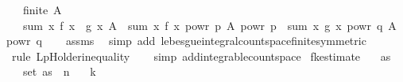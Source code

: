 \begin{isabellebody}
\ \ \ {\isachardoublequoteopen}finite\ A{\isachardoublequoteclose}\isanewline
\ \ \ {\isachardoublequoteopen}{\isasymbar}sum\ {\isacharparenleft}{\kern0pt}{\isasymlambda}x{\isachardot}{\kern0pt}\ f\ x\ {\isacharasterisk}{\kern0pt}\ g\ x{\isacharparenright}{\kern0pt}\ A{\isasymbar}\ {\isasymle}\ {\isacharparenleft}{\kern0pt}sum\ {\isacharparenleft}{\kern0pt}{\isasymlambda}x{\isachardot}{\kern0pt}\ {\isasymbar}f\ x{\isasymbar}\ powr\ p{\isacharparenright}{\kern0pt}\ A{\isacharparenright}{\kern0pt}\ powr\ {\isacharparenleft}{\kern0pt}{}{\isacharslash}{\kern0pt}p{\isacharparenright}{\kern0pt}\ {\isacharasterisk}{\kern0pt}\ {\isacharparenleft}{\kern0pt}sum\ {\isacharparenleft}{\kern0pt}{\isasymlambda}x{\isachardot}{\kern0pt}\ {\isasymbar}g\ x{\isasymbar}\ powr\ q{\isacharparenright}{\kern0pt}\ A{\isacharparenright}{\kern0pt}\ powr\ {\isacharparenleft}{\kern0pt}{}{\isacharslash}{\kern0pt}q{\isacharparenright}{\kern0pt}{\isachardoublequoteclose}\isanewline
%
\isadelimproof
\ \ %
\endisadelimproof
%
\isatagproof
{}\isamarkupfalse%
\ assms\ \isamarkupfalse%
\ {\isacharparenleft}{\kern0pt}simp\ add{\isacharcolon}{\kern0pt}\ lebesgue{\isacharunderscore}{\kern0pt}integral{\isacharunderscore}{\kern0pt}count{\isacharunderscore}{\kern0pt}space{\isacharunderscore}{\kern0pt}finite{\isacharbrackleft}{\kern0pt}symmetric{\isacharbrackright}{\kern0pt}{\isacharparenright}{\kern0pt}\isanewline
\ \ \isamarkupfalse%
\ {\isacharparenleft}{\kern0pt}rule\ Lp{\isachardot}{\kern0pt}Holder{\isacharunderscore}{\kern0pt}inequality{\isacharparenright}{\kern0pt}\isanewline
\ \ \isamarkupfalse%
\ {\isacharparenleft}{\kern0pt}simp\ add{\isacharcolon}{\kern0pt}integrable{\isacharunderscore}{\kern0pt}count{\isacharunderscore}{\kern0pt}space{\isacharparenright}{\kern0pt}{\isacharplus}{\kern0pt}%
\endisatagproof
{\isafoldproof}%
%
\isadelimproof
\isanewline
%
\endisadelimproof
\isanewline
{}\isamarkupfalse%
\ fk{\isacharunderscore}{\kern0pt}estimate{\isacharcolon}{\kern0pt}\isanewline
\ \ \ {\isachardoublequoteopen}as\ {\isasymnoteq}\ {\isacharbrackleft}{\kern0pt}{\isacharbrackright}{\kern0pt}{\isachardoublequoteclose}\isanewline
\ \ \ {\isachardoublequoteopen}set\ as\ {\isasymsubseteq}\ {\isacharbraceleft}{\kern0pt}{}{\isachardot}{\kern0pt}{\isachardot}{\kern0pt}{\isacharless}{\kern0pt}n{\isacharbraceright}{\kern0pt}{\isachardoublequoteclose}\isanewline
\ \ \ {\isachardoublequoteopen}k\ {\isasymge}\ {}{\isachardoublequoteclose}\isanewline

\end{isabellebody}
